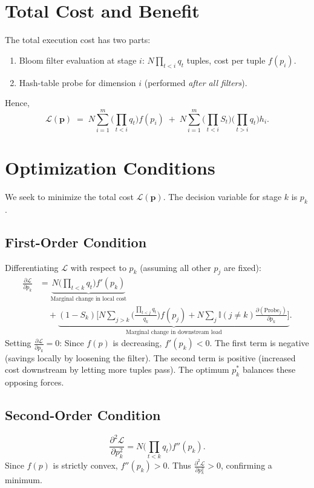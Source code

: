 \documentclass{article}
\begin{document}
\section{Total Cost and Benefit}
The total execution cost has two parts:
\begin{enumerate}
    \item Bloom filter evaluation at stage $i$: $N\!\prod_{t<i} q_t$ tuples, cost per tuple $f(p_i)$.
    \item Hash-table probe for dimension $i$ (performed \emph{after all filters}).
\end{enumerate}
Hence,
\[
\mathcal{L}(\mathbf{p}) \;=\;
N \sum_{i=1}^{m} \!\Big( \prod_{t<i} q_t \Big) f(p_i)
\;+\;
N \sum_{i=1}^{m} \!\Big( \prod_{t<i} S_t \Big)\!\Big( \prod_{t>i} q_t \Big) h_i.
\]

\section{Optimization Conditions}
We seek to minimize the total cost $\mathcal{L}(\mathbf{p})$. The decision variable for stage $k$ is $p_k$.

\subsection{First-Order Condition}
Differentiating $\mathcal{L}$ with respect to $p_k$ (assuming all other $p_{j}$ are fixed):
\[
\begin{split}
\frac{\partial \mathcal{L}}{\partial p_k} &= 
\underbrace{N \Big(\prod_{t<k} q_t\Big) f'(p_k)}_{\text{Marginal change in local cost}} \\
&\quad + \underbrace{(1-S_k) \Bigg[ 
    N \sum_{j>k} \Big( \frac{\prod_{t<j} q_t}{q_k} \Big) f(p_j) 
    + 
    N \sum_{j} \mathbb{I}(j \neq k) \frac{\partial (\text{Probe}_j)}{\partial p_k} 
\Bigg]}_{\text{Marginal change in downstream load}}.
\end{split}
\]
Setting $\frac{\partial \mathcal{L}}{\partial p_k} = 0$:
Since $f(p)$ is decreasing, $f'(p_k) < 0$. The first term is negative (savings locally by loosening the filter).
The second term is positive (increased cost downstream by letting more tuples pass).
The optimum $p_k^*$ balances these opposing forces.

\subsection{Second-Order Condition}
\[
\frac{\partial^2 \mathcal{L}}{\partial p_k^2} = N \Big(\prod_{t<k} q_t\Big) f''(p_k).
\]
Since $f(p)$ is strictly convex, $f''(p_k) > 0$. Thus $\frac{\partial^2 \mathcal{L}}{\partial p_k^2} > 0$, confirming a minimum.
\end{document}
